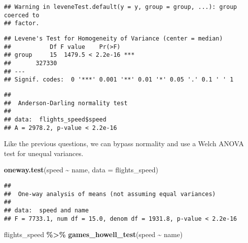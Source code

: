 \documentclass[
]{article}
\newenvironment{Shaded}{\begin{snugshade}}{\end{snugshade}}
\newcommand{\AttributeTok}[1]{\textcolor[rgb]{0.13,0.29,0.53}{#1}}
\newcommand{\CommentTok}[1]{\textcolor[rgb]{0.56,0.35,0.01}{\textit{#1}}}
\newcommand{\FunctionTok}[1]{\textcolor[rgb]{0.13,0.29,0.53}{\textbf{#1}}}
\newcommand{\NormalTok}[1]{#1}
\newcommand{\SpecialCharTok}[1]{\textcolor[rgb]{0.81,0.36,0.00}{\textbf{#1}}}
\begin{document}
\begin{verbatim}
## Warning in leveneTest.default(y = y, group = group, ...): group coerced to
## factor.
\end{verbatim}

\begin{verbatim}
## Levene's Test for Homogeneity of Variance (center = median)
##           Df F value    Pr(>F)    
## group     15  1479.5 < 2.2e-16 ***
##       327330                      
## ---
## Signif. codes:  0 '***' 0.001 '**' 0.01 '*' 0.05 '.' 0.1 ' ' 1
\end{verbatim}

\begin{Shaded}
\end{Shaded}

\begin{verbatim}
## 
##  Anderson-Darling normality test
## 
## data:  flights_speed$speed
## A = 2978.2, p-value < 2.2e-16
\end{verbatim}

Like the previous questions, we can bypass normality and use a Welch
ANOVA test for unequal variances.

\begin{Shaded}
\begin{Highlighting}[]
\FunctionTok{oneway.test}\NormalTok{(speed }\SpecialCharTok{\textasciitilde{}}\NormalTok{ name, }\AttributeTok{data =}\NormalTok{ flights\_speed)}
\end{Highlighting}
\end{Shaded}

\begin{verbatim}
## 
##  One-way analysis of means (not assuming equal variances)
## 
## data:  speed and name
## F = 7733.1, num df = 15.0, denom df = 1931.8, p-value < 2.2e-16
\end{verbatim}

\begin{Shaded}
\begin{Highlighting}[]
\NormalTok{flights\_speed }\SpecialCharTok{\%\textgreater{}\%}
  \FunctionTok{games\_howell\_test}\NormalTok{(speed }\SpecialCharTok{\textasciitilde{}}\NormalTok{ name)}
\end{Highlighting}
\end{Shaded}
\end{document}
